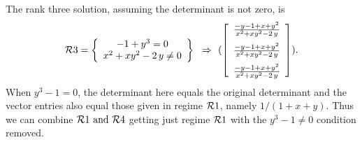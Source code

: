 \documentclass[10pt]{article}
\begin{document}

%
%
%
%
%
The rank three solution, assuming the determinant is not zero, is 
\[\RR3 = 
\breg
-1+{y}^{3}=0\\{x}^{2}+x{y}^{2}-2\,y\neq 0\ereg \implies
(
\left [\begin {array}{c} 
{\frac {-y-1+x+{y}^{2}}{{x}^{2}+x{y}^{2}-2\,y}}\\\noalign{\medskip}
{\frac {-y-1+x+{y}^{2}}{{x}^{2}+x{y}^{2}-2\,y}}\\\noalign{\medskip}
{\frac {-y-1+x+{y}^{2}}{{x}^{2}+x{y}^{2}-2\,y}}
\end {array}\right ]
).\]
When $y^3 -1 = 0$, the determinant here equals the original determinant and the vector
entries also equal those given in regime ${\cal R}1$, namely $1/(1+x+y)$.  Thus we can
combine ${\cal R}1 ~\mbox{and}~ {\cal R}4$ getting just regime ${\cal R}1$ with the $y^3 -1 \neq 0$ condition removed. 
\end{document}
